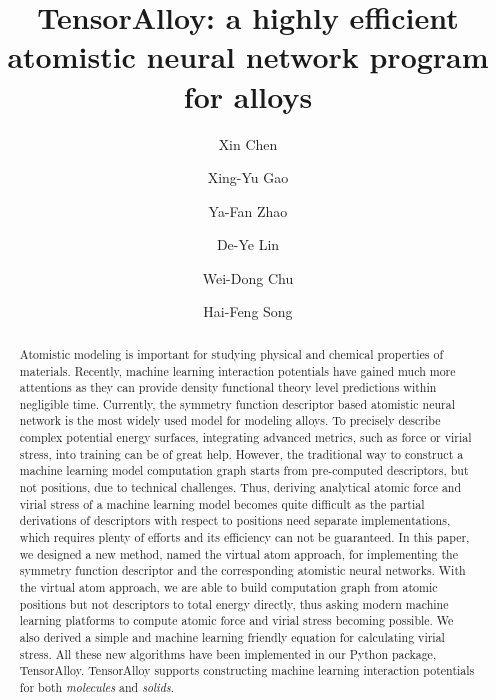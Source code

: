 \documentclass[preprint]{revtex4-2}
\begin{document}
\title{
    TensorAlloy: a highly efficient atomistic neural network program for alloys
}
\author{Xin Chen}
\author{Xing-Yu Gao}
\author{Ya-Fan Zhao}
\author{De-Ye Lin}
\author{Wei-Dong Chu}
\author{Hai-Feng Song}


\begin{abstract}
Atomistic modeling is important for studying physical and chemical properties of
materials. Recently, machine learning interaction potentials have gained much 
more attentions as they can provide density functional theory level predictions 
within negligible time. Currently, the symmetry function descriptor based 
atomistic neural network is the most widely used model for modeling alloys. 
To precisely describe complex potential energy surfaces, integrating advanced 
metrics, such as force or virial stress, into training can be of great help. 
However, the traditional way to construct a 
machine learning model computation graph starts from pre-computed descriptors, 
but not positions, due to technical challenges. Thus, deriving analytical atomic 
force and virial stress of a machine learning model becomes quite difficult as 
the partial derivations of descriptors with respect to positions need separate 
implementations, which requires plenty of efforts and its efficiency can not be 
guaranteed.
In this paper, we designed a new method, named the virtual atom approach, for 
implementing the symmetry function descriptor and the corresponding atomistic 
neural networks. With the virtual atom approach, we are able to build 
computation graph from atomic positions \textemdash but not descriptors 
\textemdash to total energy directly, thus asking modern machine learning 
platforms to compute atomic force and virial stress becoming possible. We also 
derived a simple and machine learning friendly equation for calculating virial 
stress. All these new algorithms have been implemented in our Python package, 
TensorAlloy. TensorAlloy supports constructing machine learning interaction 
potentials for both \textit{molecules} and \textit{solids}.
\end{abstract}

\maketitle
\end{document}
